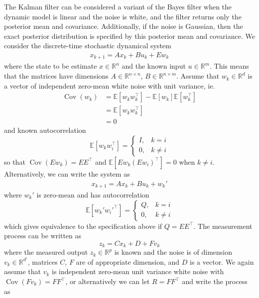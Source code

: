 \documentclass[11pt]{report} %
\begin{document}
The Kalman filter can be considered a variant of the Bayes filter when the dynamic model is linear and the noise is white, and the filter returns only the posterior mean and covariance. Additionally, if the noise is Gaussian, then the exact posterior distribution is specified by this posterior mean and covariance. We consider the discrete-time stochastic dynamical system
\begin{gather}
x_{k + 1} = Ax_{k} + Bu_{k} + Ew_{k}
\end{gather}
where the state to be estimate $x \in \mathbb{R}^{n}$ and the known input $u \in \mathbb{R}^{m}$. This means that the matrices have dimensions $A \in \mathbb{R}^{n\times n}$, $B \in \mathbb{R}^{n\times m}$. Assume that $w_{k} \in \mathbb{R}^{d}$ is a vector of independent zero-mean white noise with unit variance, ie.
\begin{align}
\operatorname{Cov}\left(w_{k}\right) &= \mathbb{E}\left[w_{k}w_{k}^{\top}\right] - \mathbb{E}\left[w_{k}\right]\mathbb{E}\left[w_{k}^{\top}\right] \\
&= \mathbb{E}\left[w_{k}w_{k}^{\top}\right] \\
&= 0
\end{align}
and known autocorrelation
\begin{equation}
\mathbb{E}\left[w_{k}w_{i}^{\top}\right] = \begin{cases} I, & k = i \\ 0, & k \neq i \end{cases}
\end{equation}
so that $\operatorname{Cov}\left(Ew_{k}\right) = EE^{\top}$ and $\mathbb{E}\left[Ew_{k}\left(Ew_{i}\right)^{\top}\right] = 0$ when $k \neq i$. Alternatively, we can write the system as
\begin{gather}
x_{k + 1} = Ax_{k} + Bu_{k} + w_{k}'
\end{gather}
where $w_{k}'$ is zero-mean and has autocorrelation
\begin{equation}
\mathbb{E}\left[w_{k}'w_{i}'^{\top}\right] = \begin{cases} Q, & k = i \\ 0, & k \neq i \end{cases}
\end{equation}
which gives equivalence to the specification above if $Q = EE^{\top}$. The measurement process can be written as
\begin{equation}
z_{k} = Cx_{k} + D + Fv_{k}
\end{equation}
where the measured output $z_{k} \in \mathbb{R}^{p}$ is known and the noise is of dimension $v_{k} \in \mathbb{R}^{d'}$, matrices $C$, $F$ are of appropriate dimension, and $D$ is a vector. We again assume that $v_{k}$ is independent zero-mean unit variance white noise with $\operatorname{Cov}\left(Fv_{k}\right) = FF^{\top}$, or alternatively we can let $R = FF^{\top}$ and write the process as
\end{document}
